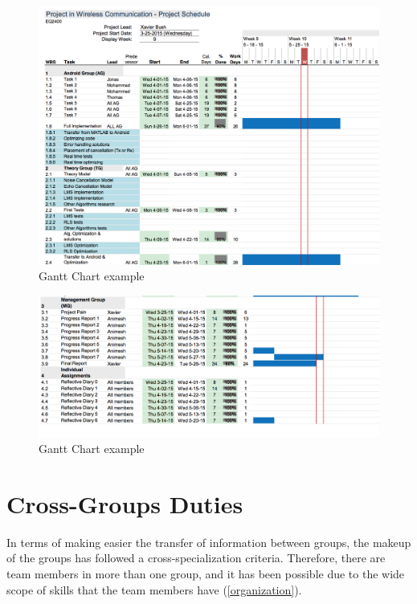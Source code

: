 \documentclass[11pt,a4paper,english]{book}  %
\theoremstyle{definition}  %
\theoremstyle{plain}  %
\theoremstyle{remark}  %
\begin{document}
		\begin{figure}[h]
		\centering
		\includegraphics[width=15cm]{images/management/ganttchart1.jpg}
		\caption{Gantt Chart example}
		\label{fig:gantt1}
		\end{figure}

		\begin{figure}[h]
		\centering
		\includegraphics[width=15cm]{images/management/ganttchart2.jpg}
		\caption{Gantt Chart example}
		\label{fig:gantt2}
		\end{figure}


\section{Cross-Groups Duties}

In terms of making easier the transfer of information between groups, the makeup of the groups has followed a cross-specialization criteria. Therefore, there are team members in more than one group, and it has been possible due to the wide scope of skills that the team members have (\ref{organization}).
\end{document}
